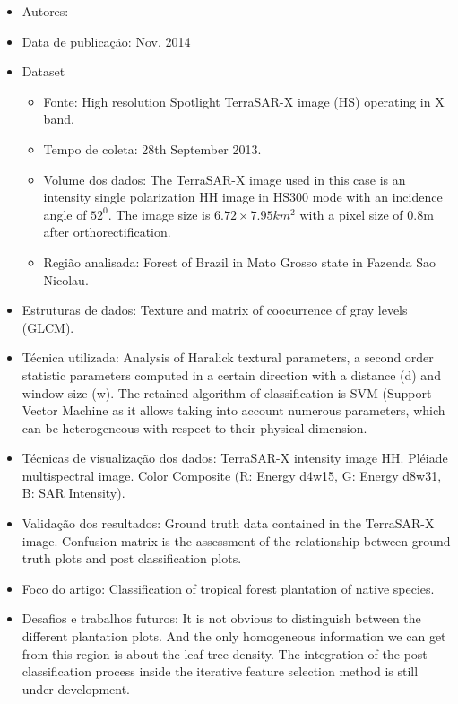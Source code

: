 \documentclass[paper=a4, fontsize=11pt]{scrartcl}
\begin{document}
\begin{itemize}
    \item Autores:~\cite{benelcadi2014using}
    \item Data de publicação: Nov. 2014
    \item Dataset
    \begin{itemize}
        \item Fonte: High resolution Spotlight TerraSAR-X image (HS) operating in X band.
        \item Tempo de coleta: 28th September 2013.
        \item Volume dos dados: The TerraSAR-X image used in this case is an intensity single polarization HH image in HS300 mode with an incidence angle of $52^0$. The image size is $6.72 \times 7.95 km^2$ with a pixel size of 0.8m after orthorectification. 
        \item Região analisada: Forest of Brazil in Mato Grosso state in Fazenda Sao Nicolau.
    \end{itemize}
    \item Estruturas de dados: Texture and matrix of coocurrence of gray levels (GLCM).
    \item Técnica utilizada: Analysis of Haralick textural parameters, a second order statistic parameters computed in a certain direction with a distance (d) and window size (w). The retained algorithm of classification is SVM (Support Vector Machine as it allows taking into account numerous parameters, which can be heterogeneous with respect to their physical dimension.
    \item Técnicas de visualização dos dados: TerraSAR-X intensity image HH. Pléiade multispectral image. Color Composite (R: Energy
d4w15, G: Energy d8w31, B: SAR Intensity).
    \item Validação dos resultados: Ground truth data contained in the TerraSAR-X image. Confusion matrix is the assessment of the relationship between ground truth plots and post classification plots.
    \item Foco do artigo: Classification of tropical forest plantation of native species.
    \item Desafios e trabalhos futuros: It is not obvious to distinguish between the different plantation plots. And the only homogeneous information we can get from this region is about the leaf tree density. The integration of the post classification process inside the iterative feature selection method is still under development.
\end{itemize}
\end{document}
